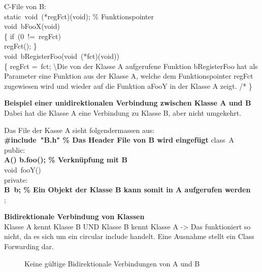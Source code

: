 C-File von B: \\
static void (*regFct)(void); \% Funktionspointer \\
void bFooX(void) \\
\{ 
	if (0 != regFct)\\
	regFct();
\}\\
void bRegisterFoo(void (*fct)(void))\\
\{
	regFct = fct; \textbackslash* Die von der Klasse A aufgerufene Funktion bRegisterFoo hat als Parameter eine Funktion aus der Klasse A, welche dem Funktionspointer regFct zugewiesen wird und wieder auf die Funktion aFooY in der Klasse A zeigt. /*
\}



\textbf{Beispiel einer unidirektionalen Verbindung zwischen Klasse A und B} \\
Dabei hat die Klasse A eine Verbindung zu Klasse B, aber nicht umgekehrt. 

Das File der Kasse A sieht folgendermassen aus: \\
\textbf{\#include "B.h"  \% Das Header File von B wird eingefügt}
class A \\
{ public: \\
	\textbf{A() { b.foo();	}  \% Verknüpfung mit B}\\
	void fooY() {} \\
	private: \\
	\textbf{B b; \% Ein Objekt der Klasse B kann somit in A aufgerufen werden} \\
};

\textbf{Bidirektionale Verbindung von Klassen} \\
Klasse A kennt Klasse B UND Klasse B kennt Klasse A -> Das funktioniert so nicht, da es sich um ein circular include handelt. Eine Ausnahme stellt ein Class Forwarding dar. \\
\begin{figure}[ht]
	\caption[]{Keine gültige Bidirektionale Verbindungen von A und B}
\end{figure}

